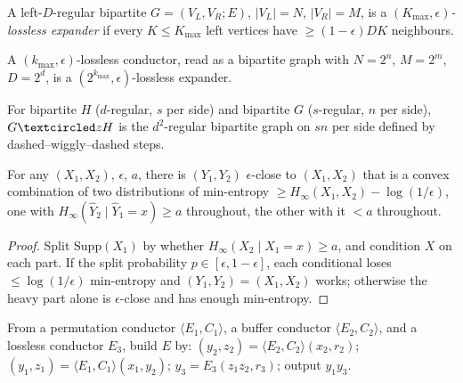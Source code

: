\begin{definition}
  \label{def:lossless-expander}
  A left-$D$-regular bipartite $G=(V_L,V_R;E)$, $|V_L|=N$, $|V_R|=M$, is a
  \emph{$(K_{\max},\epsilon)$-lossless expander} if every $K\le K_{\max}$ left
  vertices have $\ge(1-\epsilon)DK$ neighbours.
\end{definition}

\begin{claim}
  \label{claim:conductor-expander}
  \notready
  A $(k_{\max},\epsilon)$-lossless conductor, read as a bipartite graph with
  $N=2^n$, $M=2^m$, $D=2^d$, is a $(2^{k_{\max}},\epsilon)$-lossless expander.
\end{claim}

\begin{definition}
  \label{def:zigzag-bipartite}
  For bipartite $H$ ($d$-regular, $s$ per side) and bipartite $G$ ($s$-regular,
  $n$ per side), $G\zigzag H$ is the $d^2$-regular bipartite graph on $sn$ per
  side defined by dashed--wiggly--dashed steps.
\end{definition}

\begin{lemma}
  \label{lem:cond-min-entropy}
  For any $(X_1,X_2)$, $\epsilon$, $a$, there is $(Y_1,Y_2)$ $\epsilon$-close to
  $(X_1,X_2)$ that is a convex combination of two distributions of min-entropy
  $\ge H_\infty(X_1,X_2)-\log(1/\epsilon)$, one with $H_\infty(\hat Y_2\mid\hat
  Y_1=x)\ge a$ throughout, the other with it $<a$ throughout.
\end{lemma}
\begin{proof}
  Split $\mathrm{Supp}(X_1)$ by whether $H_\infty(X_2\mid X_1=x)\ge a$, and
  condition $X$ on each part. If the split probability $p\in[\epsilon,1-\epsilon]$,
  each conditional loses $\le\log(1/\epsilon)$ min-entropy and
  $(Y_1,Y_2)=(X_1,X_2)$ works; otherwise the heavy part alone is $\epsilon$-close
  and has enough min-entropy.
\end{proof}

\begin{construction}
  \label{constr:zigzag-conductors}
  From a permutation conductor $\langle E_1,C_1\rangle$, a buffer conductor
  $\langle E_2,C_2\rangle$, and a lossless conductor $E_3$, build $E$ by:
  $(y_2,z_2)=\langle E_2,C_2\rangle(x_2,r_2)$;
  $(y_1,z_1)=\langle E_1,C_1\rangle(x_1,y_2)$; $y_3=E_3(z_1z_2,r_3)$; output
  $y_1y_3$.
\end{construction}

